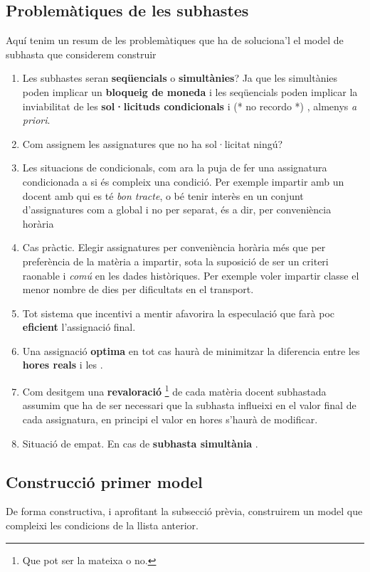 \documentclass[10pt,twocolumn]{article}
\newcommand{\nehh}[1]{\color{magenta} (* {#1} *) \normalcolor }
\begin{document}
\subsection{Problemàtiques de les  subhastes}
Aquí tenim un resum de les problemàtiques que ha de soluciona'l el model de subhasta que considerem construir 
\begin{tcolorbox}[colback=black!1,title=\textbf{Llista problemàtiques subhastes},coltitle=black,colbacktitle=black!10]
\begin{enumerate}
	\item Les subhastes seran \textbf{seqüencials} o \textbf{simultànies}? Ja que les simultànies  poden implicar un \textbf{bloqueig de moneda} i les seqüencials poden implicar la inviabilitat de les \textbf{sol·licituds condicionals} i \nehh{no recordo}, almenys \textit{ a priori}.
	\item Com assignem les assignatures que no ha sol·licitat ningú?
	\item Les situacions de condicionals, com ara la puja de fer una assignatura condicionada a si  és compleix una condició.{\color{gray} Per exemple impartir amb un docent amb qui es té  \textit{bon tracte}, o bé tenir interès en un conjunt d'assignatures com a global i no per separat, és a dir, per conveniència horària} 
	\item Cas pràctic. Elegir assignatures per conveniència horària més  que per preferència de la matèria a impartir, sota la suposició de ser un criteri raonable i \textit{comú} en les dades històriques. {\color{gray} Per exemple voler impartir classe el menor nombre de dies per dificultats en el transport.}  
	\item Tot sistema que incentivi a mentir afavorira la especulació que farà poc \textbf{eficient} l'assignació final.
	\item Una assignació \textbf{optima} en tot cas haurà de  minimitzar la diferencia entre les \textbf{hores reals} i les .
	\item Com desitgem una \textbf{revaloració} \footnote{Que pot ser la mateixa o no.} de cada matèria docent subhastada assumim que ha de ser necessari que la subhasta influeixi en el valor final de cada assignatura, en principi el valor en hores s'haurà de modificar.
	\item Situació de empat. {\color{gray} En cas de \textbf{subhasta simultània} .}
\end{enumerate}
\end{tcolorbox}
\subsection{Construcció primer model}
De forma constructiva, i aprofitant la subsecció prèvia, construirem un model que compleixi les condicions  de la llista anterior.
\end{document}
